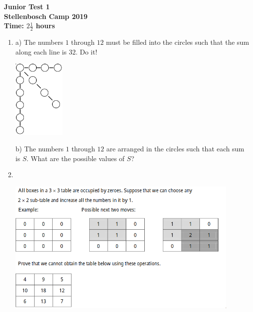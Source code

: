 \documentclass{article}
\begin{document}
\thispagestyle{empty}

\begin{center}
  \textbf{\Large Junior Test 1}
  \\ \vspace{1em}
  \textbf{\large Stellenbosch Camp 2019}
  \\ \vspace{1em}
  \textbf{\large Time: $2\frac{1}{2}$ hours}
\end{center}

\vspace{6.81mm}

\begin{enumerate}[1.]

\item %
a) The numbers $1$ through $12$ must be filled into the circles such that the sum along each line is $32$. Do it!

\begin{center}
    \includegraphics[width=0.2\textwidth]{test_1_question_1}
\end{center}
b) The numbers $1$ through $12$ are arranged in the circles such that each sum is $S$. What are the possible values of $S$?
\vspace{6.81mm}


\item %
~
\begin{center}
    \includegraphics[width=0.9\textwidth]{test_1_question_2}
\end{center}
\vspace{6.81mm}



\end{enumerate}
\end{document}

